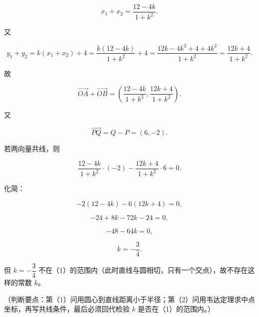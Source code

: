 \begin{answer}
\nopagebreak[4]
\[x_1+x_2=\frac{12-4k}{1+k^2}.\]

又

\nopagebreak[4]
\[y_1+y_2=k(x_1+x_2)+4=\frac{k(12-4k)}{1+k^2}+4=\frac{12k-4k^2+4+4k^2}{1+k^2}=\frac{12k+4}{1+k^2}.\]

故

\nopagebreak[4]
\[\overrightarrow{OA}+\overrightarrow{OB}=\left(\frac{12-4k}{1+k^2},\frac{12k+4}{1+k^2}\right).\]

又

\nopagebreak[4]
\[\overrightarrow{PQ}=Q-P=(6,-2).\]

若两向量共线，则

\nopagebreak[4]
\[\frac{12-4k}{1+k^2}\cdot(-2)-\frac{12k+4}{1+k^2}\cdot6=0.\]

化简：

\nopagebreak[4]
\[-2(12-4k)-6(12k+4)=0,\]

\nopagebreak[4]
\[-24+8k-72k-24=0,\]

\nopagebreak[4]
\[-48-64k=0,\]

\nopagebreak[4]
\[k=-\frac34.\]

但 $k=-\dfrac34$ 不在（1）的范围内（此时直线与圆相切，只有一个交点），故不存在这样的常数 $k$。

（判断要点：第（1）问用圆心到直线距离小于半径；第（2）问用韦达定理求中点坐标，再写共线条件，最后必须回代检验 $k$ 是否在（1）的范围内。）


\end{answer}

